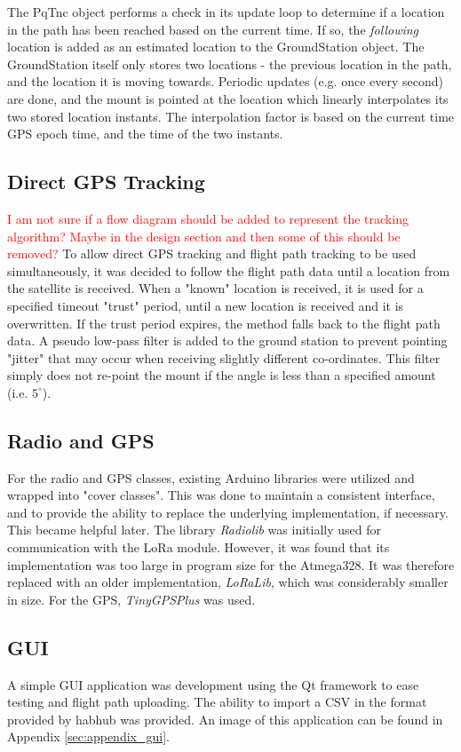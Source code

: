 The PqTnc object performs a check in its update loop to determine if a location in the path has been reached based on the current time. If so, the \textit{following} location is added as an estimated location to the GroundStation object. The GroundStation itself only stores two locations - the previous location in the path, and the location it is moving towards. Periodic updates (e.g. once every second) are done, and the mount is pointed at the location which linearly interpolates its two stored location instants. The interpolation factor is based on the current time GPS epoch time, and the time of the two instants.

\subsection{Direct GPS Tracking}
\textcolor{red}{I am not sure if a flow diagram should be added to represent the tracking algorithm? Maybe in the design section and then some of this should be removed?}
To allow direct GPS tracking and flight path tracking to be used simultaneously, it was decided to follow the flight path data until a location from the satellite is received. When a "known" location is received, it is used for a specified timeout "trust" period, until a new location is received and it is overwritten. If the trust period expires, the method falls back to the flight path data. A pseudo low-pass filter is added to the ground station to prevent pointing "jitter" that may occur when receiving slightly different co-ordinates. This filter simply does not re-point the mount if the angle is less than a specified amount (i.e. $5^{\circ}$).

\subsection{Radio and GPS}
For the radio and GPS classes, existing Arduino libraries were utilized and wrapped into "cover classes". This was done to maintain a consistent interface, and to provide the ability to replace the underlying implementation, if necessary. This became helpful later. The library \textit{Radiolib} was initially used for communication with the LoRa module. However, it was found that its implementation was too large in program size for the Atmega328. It was therefore replaced with an older implementation, \textit{LoRaLib}, which was considerably smaller in size. For the GPS, \textit{TinyGPSPlus} was used.

\subsection{GUI}
A simple GUI application was development using the Qt framework to ease testing and flight path uploading. The ability to import a CSV in the format provided by habhub was provided. An image of this application can be found in Appendix \ref{sec:appendix_gui}.